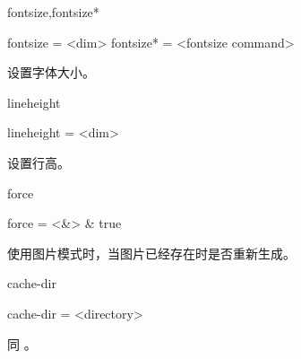 \documentclass[class=article,openany]{cusdoc}[2025/09/29]
\begin{document}
\begin{keyval}[path=layout]{fontsize,fontsize*}
  \begin{syntax}
    fontsize  = <{dim}>
    fontsize* = <{fontsize command}>
  \end{syntax}
设置字体大小。
\end{keyval}

\begin{keyval}[path=layout]{lineheight}
  \begin{syntax}
    lineheight = <{dim}>
  \end{syntax}
设置行高。
\end{keyval}

\begin{keyval}[path=layout]{force}
  \begin{syntax}
    force = <&\TTF> & true
  \end{syntax}
使用图片模式时，当图片已经存在时是否重新生成。
\end{keyval}

\begin{keyval}[path=layout]{cache-dir}
  \begin{syntax}
    cache-dir = <{directory}>
  \end{syntax}
同 。
\end{keyval}


\printbibliography[heading=titleed]

\printindex[docchange]

\vspace{15pt}

\printindex[docusage]
\end{document}
